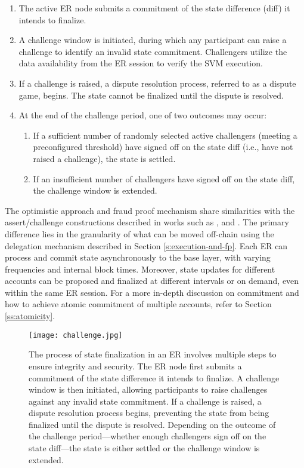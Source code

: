 \documentclass{article}
\begin{document}
\begin{enumerate}
    \item The active ER node submits a commitment of the state difference (diff) it intends to finalize.
    
    \item A challenge window is initiated, during which any participant can raise a challenge to identify an invalid state commitment. Challengers utilize the data availability from the ER session to verify the SVM execution.

    \item If a challenge is raised, a dispute resolution process, referred to as a dispute game, begins. The state cannot be finalized until the dispute is resolved.
    
    \item At the end of the challenge period, one of two outcomes may occur:

    \begin{enumerate}
        \item If a sufficient number of randomly selected active challengers (meeting a preconfigured threshold) have signed off on the state diff (i.e., have not raised a challenge), the state is settled.
        \item If an insufficient number of challengers have signed off on the state diff, the challenge window is extended.
    \end{enumerate}
\end{enumerate}

The optimistic approach and fraud proof mechanism share similarities with the assert/challenge constructions described in works such as \cite{Poon2017PlasmaS}, \cite{DBLP:journals/corr/abs-1904-06441} and \cite{Kalodner2018ArbitrumSP}. The primary difference lies in the granularity of what can be moved off-chain using the delegation mechanism described in Section \ref{s:execution-and-fp}. Each ER can process and commit state asynchronously to the base layer, with varying frequencies and internal block times. Moreover, state updates for different accounts can be proposed and finalized at different intervals or on demand, even within the same ER session. For a more in-depth discussion on commitment and how to achieve atomic commitment of multiple accounts, refer to Section \ref{ss:atomicity}.


\begin{figure*}[t!]
    \texttt{[image: challenge.jpg]}
    \caption{The process of state finalization in an ER involves multiple steps to ensure integrity and security. The ER node first submits a commitment of the state difference it intends to finalize. A challenge window is then initiated, allowing participants to raise challenges against any invalid state commitment. If a challenge is raised, a dispute resolution process begins, preventing the state from being finalized until the dispute is resolved. Depending on the outcome of the challenge period—whether enough challengers sign off on the state diff—the state is either settled or the challenge window is extended.}
    \label{fig2:multi-dimensional}
\end{figure*}
\end{document}
